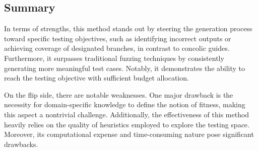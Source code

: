 \subsection{Summary}
In terms of strengths, this method stands out by steering the generation process toward specific testing objectives, such as identifying incorrect outputs or achieving coverage of designated branches, in contrast to concolic guides. 
Furthermore, it surpasses traditional fuzzing techniques by consistently generating more meaningful test cases. 
Notably, it demonstrates the ability to reach the testing objective with sufficient budget allocation.

On the flip side, there are notable weaknesses. 
One major drawback is the necessity for domain-specific knowledge to define the notion of fitness, making this aspect a nontrivial challenge. 
Additionally, the effectiveness of this method heavily relies on the quality of heuristics employed to explore the testing space. 
Moreover, its computational expense and time-consuming nature pose significant drawbacks.